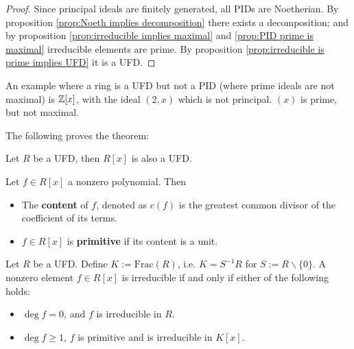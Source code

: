 \documentclass{article}
\begin{document}
\begin{proof}
    Since principal ideals are finitely generated, all PIDs are Noetherian. By proposition \ref{prop:Noeth implies decomposition} there exists a decomposition; and by proposition \ref{prop:irreducible implies maximal} and \ref{prop:PID prime is maximal} irreducible elements are prime. By proposition \ref{prop:irreducible is prime implies UFD} it is a UFD.
\end{proof}

\begin{example}
    An example where a ring is a UFD but not a PID (where prime ideals are not maximal) is $\mathbb{Z}[x]$, with the ideal $(2,x)$ which is not principal. $(x)$ is prime, but not maximal.
\end{example}

The following proves the theorem:

\begin{theorem}\label{thm:R UFD implies R[x] UFD}
    Let $R$ be a UFD, then $R[x]$ is also a UFD.
\end{theorem}

\begin{definition}
    Let $f\in R[x]$ a nonzero polynomial. Then
    \begin{itemize}
        \item The \textbf{content} of $f$, denoted as $c(f)$ is the greatest common divisor of the coefficient of its terms.
        \item $f\in R[x]$ is \textbf{primitive} if its content is a unit.
    \end{itemize}
\end{definition}

\begin{lemma}\label{lem:criterion for polynomial irreducible}
    Let $R$ be a UFD. Define $K := \mathrm{Frac}(R)$, i.e. $K = S^{-1}R$ for $S := R\smallsetminus \{0\}$. A nonzero element $f\in R[x]$ is irreducible if and only if either of the following holds:
    \begin{itemize}
        \item $\deg f = 0$, and $f$ is irreducible in $R$.
        \item $\deg f \geq 1$, $f$ is primitive and is irreducible in $K[x]$. 
    \end{itemize}
\end{lemma}
\end{document}
